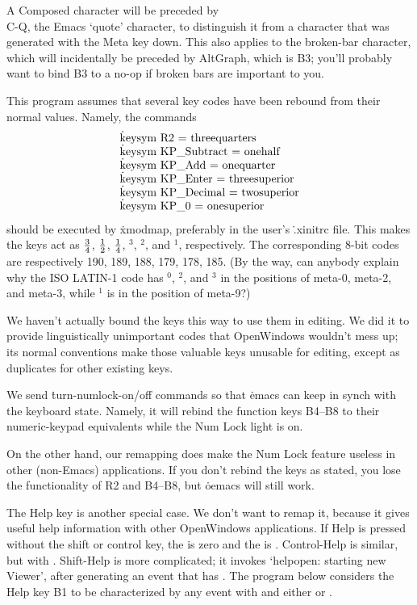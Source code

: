 A Composed character will be preceded by \.{\\C-Q}, the Emacs `quote'
character, to distinguish it from a character that was generated with the
Meta key down. This also applies to the broken-bar character, which
will incidentally be preceded by AltGraph, which is B3; you'll probably
want to bind B3 to a no-op if broken bars are important to you.

\fi

This program assumes that several key codes have been rebound from
their normal values. Namely, the commands
$$\vbox{\halign{\.{#}\hfil\cr
keysym R2 = threequarters\cr
keysym KP\_Subtract = onehalf\cr
keysym KP\_Add = onequarter\cr
keysym KP\_Enter = threesuperior\cr
keysym KP\_Decimal = twosuperior\cr
keysym KP\_0 = onesuperior\cr}}$$
should be executed by \.{xmodmap}, preferably in the user's \.{.xinitrc} file.
This makes the keys act as $3\over4$, $1\over2$, $1\over4$, $^3$, $^2$, and
$^1$, respectively. The corresponding 8-bit codes are respectively
190, 189, 188, 179, 178, 185. (By the way, can anybody explain why the ISO
LATIN-1 code has $^0$, $^2$, and $^3$ in the positions of meta-0, meta-2,
and meta-3, while $^1$ is in the position of meta-9?)

We haven't actually bound the keys this way to use them in editing.
We did it to provide linguistically unimportant codes that OpenWindows
wouldn't mess up; its normal conventions make those valuable keys
unusable for editing, except as duplicates for other existing keys.

We send \.{turn-numlock-on/off} commands so that \.{emacs} can keep in
synch with the keyboard state. Namely, it will rebind the function
keys B4--B8 to their numeric-keypad equivalents while the Num Lock light is on.

On the other hand, our remapping does make the Num Lock
feature useless in other (non-Emacs) applications.  If you don't
rebind the keys as stated, you lose the functionality of R2 and B4--B8,
but \.{oemacs} will still work.

The Help key is another special case. We don't want to remap it,
because it gives useful help information with other OpenWindows
applications.  If Help is pressed without the shift or control key,
the  is zero and the  is .
Control-Help is similar, but with . Shift-Help is
more complicated; it invokes `helpopen: starting new Viewer', after
generating an event that has . The
program below considers the Help key B1 to be characterized by any
event with  and either  or
.

